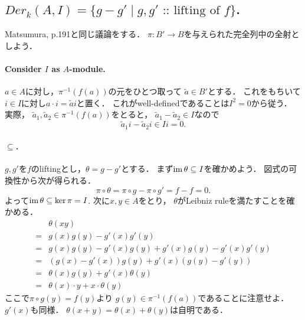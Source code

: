 \documentclass[a4paper]{jsarticle}
\begin{document}
    \subsection{$Der_k(A,I)=\{ g-g' \mid g,g' \text{ :: lifting of }f\}$.}
    Matsumura, p.191と同じ議論をする．
    $\pi: B' \to B$を与えられた完全列中の全射としよう．

    \paragraph{Consider $I$ as $A$-module.}
    $a \in A$に対し，$\pi^{-1}(f(a))$の元をひとつ取って
    $\tilde{a} \in B'$とする．
    これをもちいて$i \in I$に対し$a \cdot i=\tilde{a}i$と置く．
    これがwell-definedであることは$I^2=0$から従う．
    実際，
    $\tilde{a}_1, \tilde{a}_2 \in \pi^{-1}(f(a))$をとると，
    $\tilde{a}_1-\tilde{a}_2 \in I$なので
    \[ \tilde{a}_1 i-\tilde{a}_2 i \in I i=0. \]

    \paragraph{$\subseteq$.}
    $g, g'$を$f$のliftingとし，$\theta=g-g'$とする．
    まず$\operatorname{im} \theta \subseteq I$を確かめよう．
    図式の可換性から次が得られる．
    \[ \pi \circ \theta=\pi \circ g- \pi \circ g'=f-f=0. \]
    よって$\operatorname{im} \theta \subseteq \ker \pi=I$.
    次に$x, y \in A$をとり，
    $\theta$がLeibniz ruleを満たすことを確かめる．
    \begin{align*}
        {}& \theta(xy) \\
        =&  g(x)g(y)-g'(x)g'(y) \\
        =&  g(x)g(y)-g'(x)g(y)+g'(x)g(y)-g'(x)g'(y) \\
        =&  (g(x)-g'(x)) g(y)+g'(x) (g(y)-g'(y)) \\
        =&  \theta(x) g(y)+g'(x) \theta(y) \\
        =&  \theta(x) \cdot y+x \cdot \theta(y)
    \end{align*}
    ここで$\pi \circ g(y)=f(y)$より
    $g(y) \in \pi^{-1}(f(a))$であることに注意せよ．
    $g'(x)$も同様．
    $\theta(x+y)=\theta(x)+\theta(y)$は自明である．
\end{document}
